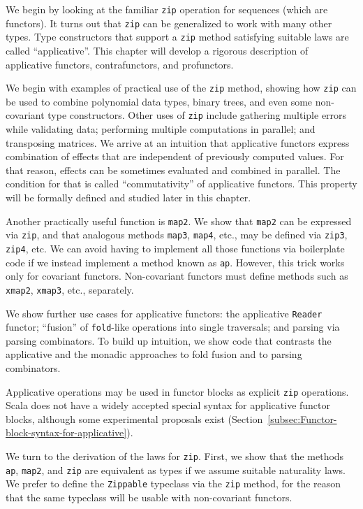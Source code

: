 We begin by looking at the familiar \lstinline!zip! operation for
sequences (which are functors). It turns out that \lstinline!zip!
can be generalized to work with many other types. Type constructors
that support a \lstinline!zip! method satisfying suitable laws are
called \textsf{``}applicative\textsf{''}. This chapter will develop a rigorous description
of applicative functors, contrafunctors, and profunctors. 

We begin with examples of practical use of the \lstinline!zip! method,
showing how \lstinline!zip! can be used to combine polynomial data
types, binary trees, and even some non-covariant type constructors.
Other uses of \lstinline!zip! include gathering multiple errors while
validating data; performing multiple computations in parallel; and
transposing matrices. We arrive at an intuition that applicative functors
express combination of effects that are independent of previously
computed values. For that reason, effects can be sometimes evaluated
and combined in parallel. The condition for that is called \textsf{``}commutativity\textsf{''}
of applicative functors. This property will be formally defined and
studied later in this chapter.

Another practically useful function is \lstinline!map2!. We show
that \lstinline!map2! can be expressed via \lstinline!zip!, and
that analogous methods \lstinline!map3!, \lstinline!map4!, etc.,
may be defined via \lstinline!zip3!, \lstinline!zip4!, etc. We can
avoid having to implement all those functions via boilerplate code
if we instead implement a method known as \lstinline!ap!. However,
this trick works only for covariant functors. Non-covariant functors
must define methods such as \lstinline!xmap2!, \lstinline!xmap3!,
etc., separately.

We show further use cases for applicative functors: the applicative
\lstinline!Reader! functor; \textsf{``}fusion\textsf{''} of \lstinline!fold!-like
operations into single traversals; and parsing via parsing combinators.
To build up intuition, we show code that contrasts the applicative
and the monadic approaches to fold fusion and to parsing combinators.

Applicative operations may be used in functor blocks as explicit \lstinline!zip!
operations. Scala does not have a widely accepted special syntax for
applicative functor blocks, although some experimental proposals exist
(Section~\ref{subsec:Functor-block-syntax-for-applicative}).

We turn to the derivation of the laws for \lstinline!zip!. First,
we show that the methods \lstinline!ap!, \lstinline!map2!, and \lstinline!zip!
are equivalent as types if we assume suitable naturality laws. We
prefer to define the \lstinline!Zippable! typeclass via the \lstinline!zip!
method, for the reason that the same typeclass will be usable with
non-covariant functors.

